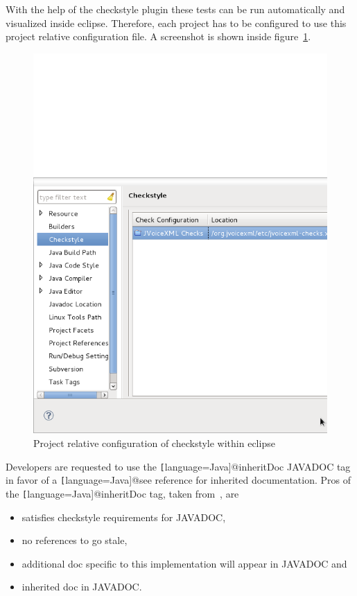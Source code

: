\documentclass[11pt,a4paper]{article}
\begin{document}
With the help of the checkstyle plugin these tests can be run automatically
and visualized inside eclipse. Therefore, each project has to be configured to
use this project relative configuration file. A screenshot is shown inside
figure~\ref{fig:eclipse-project-checkstyle}.
\begin{figure}
\includegraphics[width=\linewidth]{eclipse-project-checkstyle.png}
\caption{Project relative configuration of checkstyle within eclipse}
\label{fig:eclipse-project-checkstyle}
\end{figure}


Developers are requested to use the \texttt[language=Java]{@inheritDoc}
JAVADOC tag in favor of a \texttt[language=Java]{@see} reference for inherited documentation.
Pros of the \texttt[language=Java]{@inheritDoc} tag, taken 
from~\cite{tauber:inheritdoc}, are
\begin{itemize}
\item satisfies checkstyle requirements for JAVADOC,
\item no references to go stale,
\item additional doc specific to this implementation will appear in JAVADOC and
\item inherited doc in JAVADOC.
\end{itemize}
\end{document}
